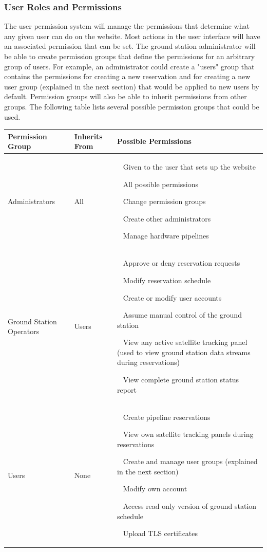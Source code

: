 \documentclass{mxl-design}
\begin{document}
\subsubsection{User Roles and Permissions}
\label{sec:user_permissions}
The user permission system will manage the permissions that determine what any given user can do on the website. Most actions in the user interface will have an associated permission that can be set. The ground station administrator will be able to create permission groups that define the permissions for an arbitrary group of users. For example, an administrator could create a "users" group that contains the permissions for creating a new reservation and for creating a new user group (explained in the next section) that would be applied to new users by default. Permission groups will also be able to inherit permissions from other groups. The following table lists several possible permission groups that could be used.

\begin{table}[H]
\begin{center}
{\renewcommand{\arraystretch}{1.5}
\begin{tabular}{p{2in}|p{1in}|p{3in}}
	\bf Permission Group & \bf Inherits From & \bf Possible Permissions \\ 
	\hline
		Administrators 
	&
		All
	&
		\textbullet~ Given to the user that sets up the website \par
		\textbullet~ All possible permissions \par
		\textbullet~ Change permission groups \par
		\textbullet~ Create other administrators \par
		\textbullet~ Manage hardware pipelines
	\\ \hline
		Ground Station Operators
	&
		Users
	&
		\textbullet~ Approve or deny reservation requests \par
		\textbullet~ Modify reservation schedule \par
		\textbullet~ Create or modify user accounts \par
		\textbullet~ Assume manual control of the ground station \par
		\textbullet~ View any active satellite tracking panel (used to view ground station data streams during reservations) \par
		\textbullet~ View complete ground station status report
	\\ \hline
		Users
	&
		None
	&
		\textbullet~ Create pipeline reservations \par
		\textbullet~ View own satellite tracking panels during reservations \par
		\textbullet~ Create and manage user groups (explained in the next section) \par
		\textbullet~ Modify own account \par
		\textbullet~ Access read only version of ground station schedule \par
		\textbullet~ Upload TLS certificates \par
	\\
\end{tabular}}
\end{center}
\end{table}
\end{document}
